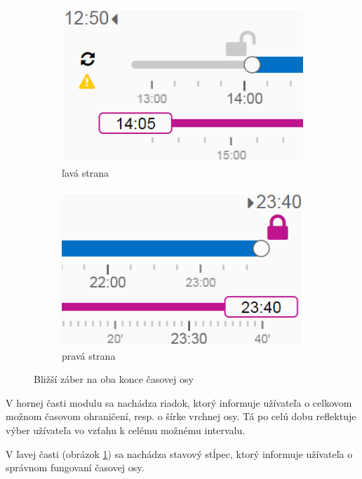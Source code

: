 \documentclass[
  digital, %
  twoside, %
  notable,   %
  nolof,   %
  nolot,   %
]{fithesis3}
\begin{document}
\begin{figure}
\centering
\begin{subfigure}{.5\textwidth}
  \centering
  \includegraphics[width=.9\linewidth]{slider_left_150}
  \caption{ľavá strana}
  \label{slider_detail_150_left}
\end{subfigure}%
\begin{subfigure}{.5\textwidth}
  \centering
  \includegraphics[width=.9\linewidth]{slider_right_150}
  \caption{pravá strana}
\end{subfigure}
\caption{Bližší záber na oba konce časovej osy}
\label{slider_detail_150}
\end{figure}

V hornej časti modulu sa nachádza riadok, ktorý informuje užívateľa o celkovom možnom časovom ohraničení, resp. o šírke vrchnej osy. Tá po celú dobu reflektuje výber užívateľa vo vzťahu k celému možnému intervalu.

V ľavej časti (obrázok \ref{slider_detail_150_left}) sa nachádza stavový stĺpec, ktorý informuje užívateľa o správnom fungovaní časovej osy.
\end{document}
